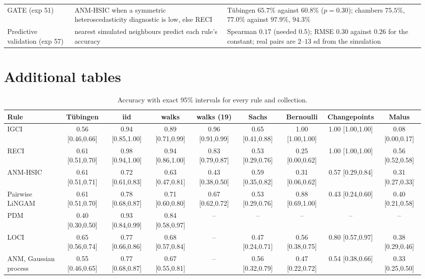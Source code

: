 \begin{longtable}{@{}p{3.2cm}p{4.3cm}p{7.2cm}@{}}
GATE (exp 51) & ANM-HSIC when a symmetric heteroscedasticity diagnostic is low, else RECI & T\"ubingen $65.7\%$ against $60.8\%$ ($p=0.30$); chambers $75.5\%$, $77.0\%$ against $97.9\%$, $94.3\%$\\
Predictive validation (exp 57) & nearest simulated neighbours predict each rule's accuracy & Spearman $0.17$ (needed $0.5$); RMSE $0.30$ against $0.26$ for the constant; real pairs are $2$--$13$ sd from the simulation\\
\bottomrule
\end{longtable}
\endgroup

\section{Additional tables}\label{app:tables}

\begin{table}[ht]
\caption{Accuracy with exact 95\% intervals for every rule and collection.}
\label{tab:collections_ci}
\scriptsize\setlength{\tabcolsep}{2pt}
\begin{tabular}{@{}lcccccccc@{}}
\toprule
Rule & T\"ubingen & iid & walks & walks (19) & Sachs & Bernoulli & Changepoints & Malus\\
\midrule
IGCI & 0.56 [0.46,0.66] & 0.94 [0.85,1.00] & 0.89 [0.71,0.99] & 0.96 [0.91,0.99] & 0.65 [0.41,0.88] & 1.00 [1.00,1.00] & 1.00 [1.00,1.00] & 0.08 [0.00,0.17]\\
RECI & 0.61 [0.51,0.70] & 0.98 [0.94,1.00] & 0.94 [0.86,1.00] & 0.83 [0.79,0.87] & 0.53 [0.29,0.76] & 0.25 [0.00,0.62] & 1.00 [1.00,1.00] & 0.56 [0.52,0.58]\\
ANM-HSIC & 0.61 [0.51,0.71] & 0.72 [0.61,0.83] & 0.63 [0.47,0.81] & 0.43 [0.38,0.50] & 0.59 [0.35,0.82] & 0.31 [0.06,0.62] & 0.57 [0.29,0.84] & 0.31 [0.27,0.33]\\
Pairwise LiNGAM & 0.61 [0.51,0.70] & 0.78 [0.68,0.87] & 0.71 [0.60,0.80] & 0.67 [0.62,0.72] & 0.53 [0.29,0.76] & 0.88 [0.69,1.00] & 0.43 [0.24,0.60] & 0.40 [0.21,0.58]\\
PDM & 0.40 [0.30,0.50] & 0.93 [0.84,0.99] & 0.84 [0.58,0.97] & -- & -- & -- & -- & --\\
LOCI & 0.65 [0.56,0.74] & 0.77 [0.66,0.86] & 0.68 [0.57,0.84] & -- & 0.47 [0.24,0.71] & 0.56 [0.38,0.75] & 0.80 [0.57,0.97] & 0.38 [0.29,0.46]\\
ANM, Gaussian process & 0.55 [0.46,0.65] & 0.77 [0.68,0.87] & 0.67 [0.55,0.81] & -- & 0.56 [0.32,0.79] & 0.47 [0.22,0.72] & 0.54 [0.38,0.66] & 0.33 [0.25,0.50]\\

\end{tabular}
\end{table}
